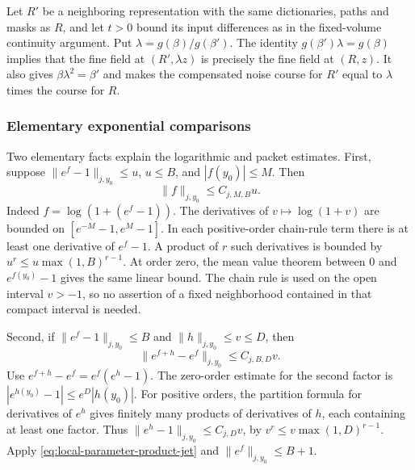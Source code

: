 Let $R'$ be a neighboring representation with the same dictionaries,
paths and masks as $R$, and let $t>0$ bound its input differences as
in the fixed-volume continuity argument. Put
$\lambda=g(\beta)/g(\beta')$. The identity
$g(\beta')\lambda=g(\beta)$ implies that the fine field at $(R',\lambda z)$
is precisely the fine field at $(R,z)$. It also gives
$\beta\lambda^2=\beta'$ and makes the compensated noise course for
$R'$ equal to $\lambda$ times the course for $R$.

\subsubsection{Elementary exponential comparisons}
Two elementary facts explain the logarithmic and packet estimates.
First, suppose $\|e^f-1\|_{j,y_0}\le u$, $u\le B$, and
$|f(y_0)|\le M$. Then
\begin{equation}\label{eq:local-parameter-log-recovery}
                         \|f\|_{j,y_0}\le C_{j,M,B}u.
\end{equation}
Indeed $f=\log(1+(e^f-1))$. The derivatives of $v\mapsto\log(1+v)$
are bounded on $[e^{-M}-1,e^M-1]$. In each positive-order chain-rule
term there is at least one derivative of $e^f-1$. A product of $r$
such derivatives is bounded by
$u^r\le u\max(1,B)^{r-1}$. At order zero, the mean value theorem
between $0$ and $e^{f(y_0)}-1$ gives the same linear bound.
The chain rule is used on the open interval $v>-1$, so no assertion
of a fixed neighborhood contained in that compact interval is needed.

Second, if $\|e^f-1\|_{j,y_0}\le B$ and
$\|h\|_{j,y_0}\le v\le D$, then
\begin{equation}\label{eq:local-parameter-exp-difference}
               \|e^{f+h}-e^f\|_{j,y_0}\le C_{j,B,D}v.
\end{equation}
Use $e^{f+h}-e^f=e^f(e^h-1)$. The zero-order estimate for the second
factor is $|e^{h(y_0)}-1|\le e^D|h(y_0)|$. For positive orders,
the partition formula for derivatives of $e^h$ gives finitely many
products of derivatives of $h$, each containing at least one factor.
Thus $\|e^h-1\|_{j,y_0}\le C_{j,D}v$, by
$v^r\le v\max(1,D)^{r-1}$. Apply
\eqref{eq:local-parameter-product-jet} and
$\|e^f\|_{j,y_0}\le B+1$.


